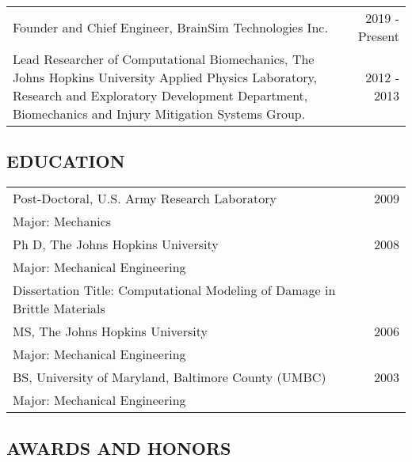 \documentclass[11pt]{article}
\begin{document}
\begin{tabularx}{\textwidth}{@{}Xr@{}}
Founder and Chief Engineer, BrainSim Technologies Inc. & 2019 - Present \\
\addlinespace[5pt]
Lead Researcher of Computational Biomechanics, The Johns Hopkins University Applied Physics Laboratory, Research and Exploratory Development Department, Biomechanics and Injury Mitigation Systems Group. & 2012 - 2013\end{tabularx}

\subsection{EDUCATION}\label{education}

\begin{flushleft}
\begin{tabularx}{\textwidth}{@{}Xr@{}}
Post-Doctoral, U.S. 
Army Research Laboratory & 2009\\
Major: Mechanics \\
\addlinespace[5pt]
Ph D, The Johns Hopkins University & 2008\\
Major: Mechanical Engineering\\
Dissertation Title: Computational Modeling of Damage in Brittle
Materials \\
\addlinespace[5pt]
MS, The Johns Hopkins University & 2006\\
Major: Mechanical Engineering \\
\addlinespace[5pt]
BS, University of Maryland, Baltimore County (UMBC) & 2003\\
Major: Mechanical Engineering
\end{tabularx}
\end{flushleft}

\subsection{AWARDS AND HONORS}\label{awards-and-honors}
\end{document}
